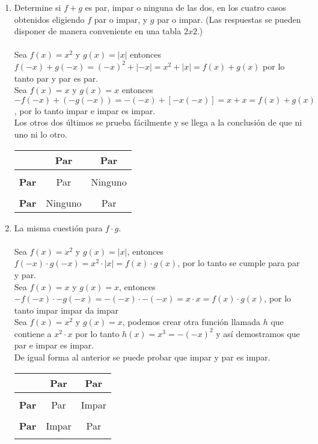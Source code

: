 \begin{ej}
\begin{enumerate}[\bfseries a)]
\item Determine si $f+g$ es par, impar o ninguna de las dos, en los cuatro casos obtenidos eligiendo $f$ par o impar, y $g$ par o impar. (Las respuestas se pueden disponer de manera conveniente en una tabla $2x2$.)\\\\
Sea $f(x)=x^2$ y $g(x)=|x|$ entonces $f(-x)+g(-x)=(-x)^2 + |-x| = x^2 + |x| = f(x) + g(x)$ por lo tanto par y par es par.\\
Sea $f(x) = x$ y $g(x)=x$ entonces $-f(-x) + (-g(-x)) = -(-x) + [-x(-x)] = x + x = f(x) + g(x)$, por lo tanto impar e impar es impar.\\
Los otros dos últimos se prueba fácilmente y se llega a la conclusión de que ni uno ni lo otro.
\begin{center}
\begin{tabular}{c|cc}
&\textbf{Par}&\textbf{Par}\\
\hline\\
\textbf{Par}&Par&Ninguno\\\\
\textbf{Par}&Ninguno&Par\\
\end{tabular}
\end{center}
\item La misma cuestión para $f \cdot g.$\\\\
Sea $f(x)=x^2$ \; y \; $g(x)=|x|$, entonces $f(-x) \cdot g(-x) = x^2 \cdot |x| = f(x) \cdot g(x)$, por lo tanto se cumple para par y par.\\
Sea $f(x)=x$ \; y \; $g(x)=x$, entonces $-f(-x) \cdot -g(-x) = -(-x) \cdot -(-x) = x \cdot x = f(x) \cdot g(x)$, por lo tanto impar impar da impar\\
Sea $f(x)=x^2$ \; y \; $g(x)=x$, podemos crear otra función llamada $h$ que contiene a $x^2 \cdot x$ por lo tanto $h(x)=x^3 = -(-x)^2$ y así demostramos que par e impar es impar.\\
De igual forma al anterior se puede probar que impar y par es impar.
\begin{center}
\begin{tabular}{c|cc}
&\textbf{Par}&\textbf{Par}\\
\hline\\
\textbf{Par}&Par&Impar\\\\
\textbf{Par}&Impar&Par\\\\

\end{tabular}
\end{center}
\end{enumerate}
\end{ej}

